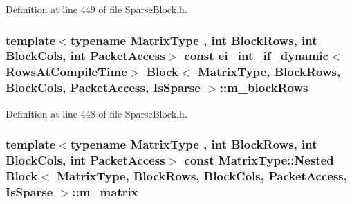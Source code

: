 Definition at line 449 of file Sparse\-Block.\-h.

\hypertarget{class_block_3_01_matrix_type_00_01_block_rows_00_01_block_cols_00_01_packet_access_00_01_is_sparse_01_4_a7c5ff9c106b46ca33a056bf6af597df1}{
\subsubsection[{m\-\_\-block\-Rows}]{\setlength{\rightskip}{0pt plus 5cm}template$<$typename Matrix\-Type , int Block\-Rows, int Block\-Cols, int Packet\-Access$>$ const ei\-\_\-int\-\_\-if\-\_\-dynamic$<${\bf Rows\-At\-Compile\-Time}$>$ {\bf Block}$<$ Matrix\-Type, Block\-Rows, Block\-Cols, Packet\-Access, {\bf Is\-Sparse} $>$\-::m\-\_\-block\-Rows\hspace{0.3cm}{\ttfamily [protected]}}}\label{class_block_3_01_matrix_type_00_01_block_rows_00_01_block_cols_00_01_packet_access_00_01_is_sparse_01_4_a7c5ff9c106b46ca33a056bf6af597df1}


Definition at line 448 of file Sparse\-Block.\-h.

\hypertarget{class_block_3_01_matrix_type_00_01_block_rows_00_01_block_cols_00_01_packet_access_00_01_is_sparse_01_4_a4a32807f94aefd0d12d8e28e619dd3e8}{
\subsubsection[{m\-\_\-matrix}]{\setlength{\rightskip}{0pt plus 5cm}template$<$typename Matrix\-Type , int Block\-Rows, int Block\-Cols, int Packet\-Access$>$ const Matrix\-Type\-::\-Nested {\bf Block}$<$ Matrix\-Type, Block\-Rows, Block\-Cols, Packet\-Access, {\bf Is\-Sparse} $>$\-::m\-\_\-matrix\hspace{0.3cm}{\ttfamily [protected]}}}\label{class_block_3_01_matrix_type_00_01_block_rows_00_01_block_cols_00_01_packet_access_00_01_is_sparse_01_4_a4a32807f94aefd0d12d8e28e619dd3e8}



